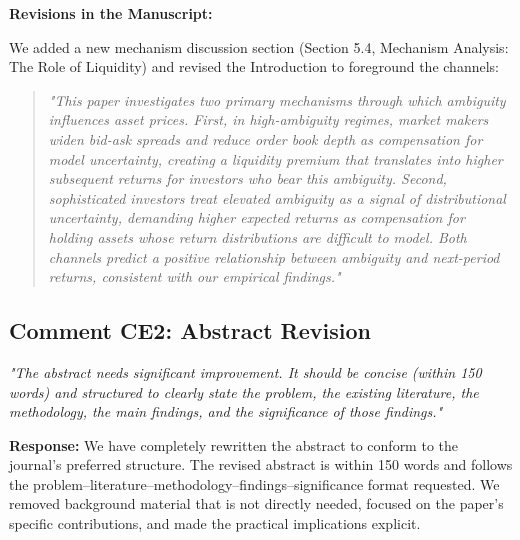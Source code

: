 \documentclass[12pt]{article}
\begin{document}
\begin{highlightbox}
\textbf{Revisions in the Manuscript:}

We added a new mechanism discussion section (Section 5.4, Mechanism Analysis: The Role of Liquidity) and revised the Introduction to foreground the channels:
\vspace{0.2cm}
\begin{quote}
\itshape "This paper investigates two primary mechanisms through which ambiguity influences asset prices. First, in high-ambiguity regimes, market makers widen bid-ask spreads and reduce order book depth as compensation for model uncertainty, creating a liquidity premium that translates into higher subsequent returns for investors who bear this ambiguity. Second, sophisticated investors treat elevated ambiguity as a signal of distributional uncertainty, demanding higher expected returns as compensation for holding assets whose return distributions are difficult to model. Both channels predict a positive relationship between ambiguity and next-period returns, consistent with our empirical findings."
\end{quote}
\end{highlightbox}

\subsection*{Comment CE2: Abstract Revision}
\textit{"The abstract needs significant improvement. It should be concise (within 150 words) and structured to clearly state the problem, the existing literature, the methodology, the main findings, and the significance of those findings."}

\begin{highlightbox}
\textbf{Response:} We have completely rewritten the abstract to conform to the journal's preferred structure. The revised abstract is within 150 words and follows the problem--literature--methodology--findings--significance format requested. We removed background material that is not directly needed, focused on the paper's specific contributions, and made the practical implications explicit.
\end{highlightbox}
\end{document}
